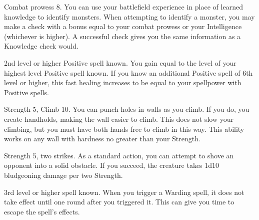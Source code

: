 \featpre Combat prowess 8.
\featben You can use your battlefield experience in place of learned knowledge to identify monsters.
When attempting to identify a monster, you may make a check with a bonus equal to your combat prowess or your Intelligence (whichever is higher).
A successful check gives you the same information as a Knowledge check would.

\featpre 2nd level or higher Positive spell known.
\featben You gain  equal to the level of your highest level Positive spell known.
If you know an additional Positive spell of 6th level or higher, this fast healing increases to be equal to your spellpower with Positive spells.

\featpres Strength 5, Climb 10.
\featben You can punch holes in walls as you climb.
If you do, you create handholds, making the wall easier to climb.
This does not slow your climbing, but you must have both hands free to climb in this way.
This ability works on any wall with hardness no greater than your Strength.

\featpres Strength 5, two strikes.
\featben As a standard action, you can attempt to shove an opponent into a solid obstacle.
If you succeed, the creature takes 1d10 bludgeoning damage per two Strength.

\featpre 3rd level or higher  spell known.
\featben When you trigger a Warding spell, it does not take effect until one round after you triggered it. This can give you time to escape the spell's effects.

